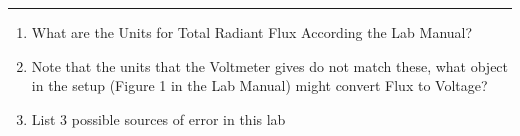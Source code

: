\documentclass[11pt]{article}
\begin{document}
\Large

\medskip\hrule\bigskip\bigskip
{}
\begin{enumerate}

\item What are the Units for Total Radiant Flux According the Lab Manual?
  \vspace*{0.27\textheight}
\item Note that the units that the Voltmeter gives do not match these, what object in the setup (Figure 1 in the Lab Manual) might convert Flux to Voltage?
  \vspace*{0.27\textheight}
\item List 3 possible sources of error in this lab
  
\end{enumerate}
\end{document}
